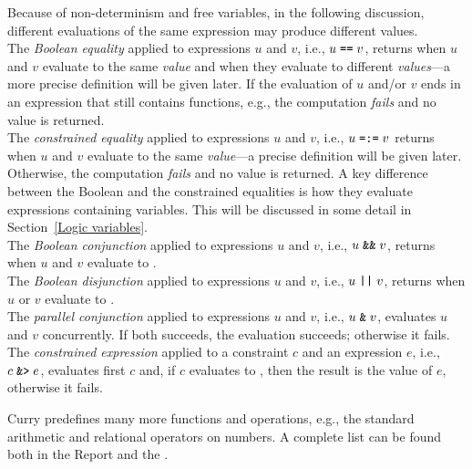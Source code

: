 \vspace{3ex}
\noindent
Because of non-determinism and free variables, in the following discussion,
different evaluations of the same expression may produce different values.
\\[1ex]
The \emph{Boolean equality}
applied to expressions $u$ and $v$, i.e.,
$u\;\mbox{\tt ==}\;v$, returns 
when $u$ and $v$ evaluate to the
same \emph{value} and  when they
evaluate to different \emph{values}---a
more precise definition will be given later. 
If the evaluation of $u$ and/or $v$ ends in an expression that
still contains functions, e.g.,  the computation
\emph{fails} and no value is returned.
\\[1ex]
The \emph{constrained equality}%
applied to expressions $u$ and $v$, i.e.,
$u\;\mbox{\tt =:=}\;v$ returns 
when $u$ and $v$ evaluate to the
same \emph{value}---a precise definition will be given later. 
Otherwise, the computation \emph{fails} and no value is returned.
A key difference between the Boolean and the constrained equalities
is how they evaluate expressions containing variables.
This will be discussed in some detail in Section~\ref{Logic variables}.
\\[1ex]
The \emph{Boolean conjunction}%
applied to expressions $u$ and $v$, i.e.,
$u\;\mbox{\tt \&\&}\;v$, returns 
when $u$ and $v$ evaluate to .
\\[1ex]
The \emph{Boolean disjunction}%
applied to expressions $u$ and $v$, i.e.,
$u\;\mbox{\tt ||}\;v$, returns 
when $u$ or $v$ evaluate to .
\\[1ex]
The \emph{parallel conjunction}%
applied to expressions $u$ and $v$, i.e.,
$u\;\mbox{\tt \&}\;v$, evaluates $u$ and $v$ concurrently.
If both succeeds, the evaluation succeeds;
otherwise it fails.
\\[1ex]
The \emph{constrained expression}%
applied to a constraint $c$ and an expression $e$, i.e.,
$c\;\mbox{\tt \&>}\;e$, evaluates first $c$ and, if $c$ evaluates
to , then the result is the value of $e$, otherwise it fails.

Curry predefines many more functions and operations, e.g.,
the standard arithmetic and relational operators on numbers.
A complete list can be found both in the Report and the .

